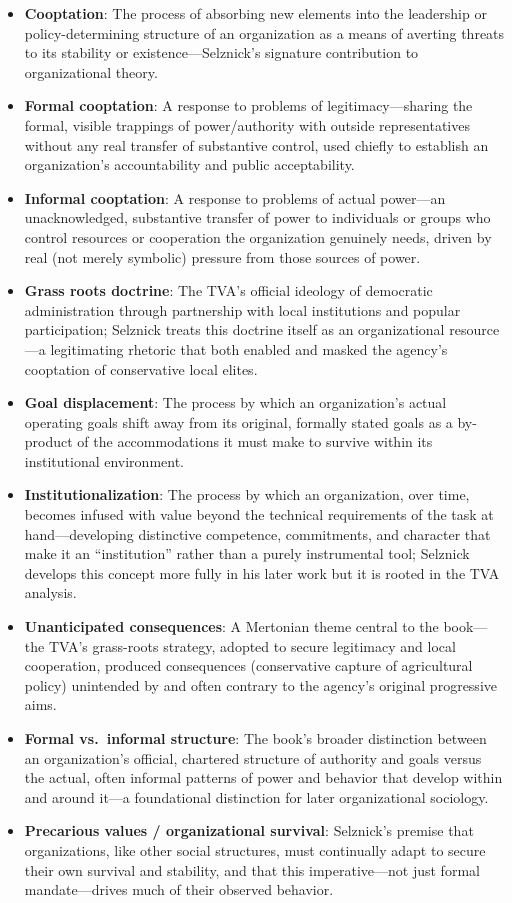 \documentclass[12pt]{article}
\begin{document}
\begin{itemize}[leftmargin=*, itemsep=4pt]
    \item \textbf{Cooptation}: The process of absorbing new elements into the leadership or policy-determining structure of an organization as a means of averting threats to its stability or existence---Selznick's signature contribution to organizational theory.
    \item \textbf{Formal cooptation}: A response to problems of legitimacy---sharing the formal, visible trappings of power/authority with outside representatives without any real transfer of substantive control, used chiefly to establish an organization's accountability and public acceptability.
    \item \textbf{Informal cooptation}: A response to problems of actual power---an unacknowledged, substantive transfer of power to individuals or groups who control resources or cooperation the organization genuinely needs, driven by real (not merely symbolic) pressure from those sources of power.
    \item \textbf{Grass roots doctrine}: The TVA's official ideology of democratic administration through partnership with local institutions and popular participation; Selznick treats this doctrine itself as an organizational resource---a legitimating rhetoric that both enabled and masked the agency's cooptation of conservative local elites.
    \item \textbf{Goal displacement}: The process by which an organization's actual operating goals shift away from its original, formally stated goals as a by-product of the accommodations it must make to survive within its institutional environment.
    \item \textbf{Institutionalization}: The process by which an organization, over time, becomes infused with value beyond the technical requirements of the task at hand---developing distinctive competence, commitments, and character that make it an ``institution'' rather than a purely instrumental tool; Selznick develops this concept more fully in his later work but it is rooted in the TVA analysis.
    \item \textbf{Unanticipated consequences}: A Mertonian theme central to the book---the TVA's grass-roots strategy, adopted to secure legitimacy and local cooperation, produced consequences (conservative capture of agricultural policy) unintended by and often contrary to the agency's original progressive aims.
    \item \textbf{Formal vs.\ informal structure}: The book's broader distinction between an organization's official, chartered structure of authority and goals versus the actual, often informal patterns of power and behavior that develop within and around it---a foundational distinction for later organizational sociology.
    \item \textbf{Precarious values / organizational survival}: Selznick's premise that organizations, like other social structures, must continually adapt to secure their own survival and stability, and that this imperative---not just formal mandate---drives much of their observed behavior.
\end{itemize}
\end{document}
